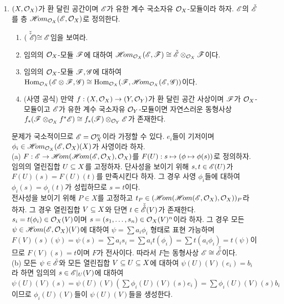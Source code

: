 	\begin{enumerate}[label=\tb{5.\arabic*.},itemindent=0mm,itemsep=4mm]
	\item $(X,\mathcal{O}_X)$가 환 달린 공간이며 $\mathscr{E}$가 유한 계수 국소자유 $\mathcal{O}_X$-모듈이라 하자.
	$\mathscr{E}$의  $\check{\mathscr{E}}$를 층 $\mathscr{H}\!om_{\mathcal{O}_X}(\mathscr{E},\mathcal{O}_X)$로 정의한다.
	\begin{enumerate}[label=(\alph*)]
	\item $\check{(\check{\mathscr{E}})}\cong\mathscr{E}$임을 보여라.
	\item 임의의 $\mathcal{O}_X$-모듈 $\mathscr{F}$에 대하여 $\mathscr{H}\!om_{\mathcal{O}_X}(\mathscr{E},\mathscr{F})\cong\check{\mathscr{E}}\otimes_{\mathcal{O}_X}\mathscr{F}$이다.
	\item 임의의 $\mathcal{O}_X$-모듈 $\mathscr{F},\mathscr{G}$에 대하여 $\operatorname{Hom}_{\mathcal{O}_X}(\mathscr{E}\otimes\mathscr{F},\mathscr{G})\cong
	\operatorname{Hom}_{\mathcal{O}_X}(\mathscr{F},\mathscr{H}\!om_{\mathcal{O}_X}(\mathscr{E},\mathscr{G}))$이다.
	\item (사영 공식) 만약 $f:(X,\mathcal{O}_X)\rightarrow(Y,\mathcal{O}_Y)$가 환 달린 공간 사상이며 $\mathscr{F}$가 $\mathcal{O}_X$-모듈이고
	$\mathscr{E}$가 유한 계수 국소자유 $\mathcal{O}_Y$-모듈이면
	자연스러운 동형사상 $f_*(\mathscr{F}\otimes_{\mathcal{O}_X}f^*\mathscr{E})\cong f_*(\mathscr{F})\otimes_{\mathcal{O}_Y}\mathscr{E}$가 존재한다.
	\end{enumerate}
	\sol 문제가 국소적이므로 $\mathscr{E}=\mathcal{O}_X^n$이라 가정할 수 있다.
	$e_i$들이 기저이며 $\phi_i\in\mathscr{H}\!om_{\mathcal{O}_X}(\mathscr{E},\mathcal{O}_X)(X)$가 사영이라 하자.\\
	(a) $F:\mathscr{E}\rightarrow\mathscr{H}\!om(\mathscr{H}\!om(\mathscr{E},\mathcal{O}_X),\mathcal{O}_X)$를 $F(U):s\mapsto(\phi\mapsto\phi(s))$로 정의하자.
	임의의 열린집합 $U\subseteq X$를 고정하자. 단사성을 보이기 위해 $s,t\in\mathscr{E}(U)$가 $F(U)(s)=F(U)(t)$를 만족시킨다 하자.
	그 경우 사영 $\phi_i$들에 대하여 $\phi_i(s)=\phi_i(t)$가 성립하므로 $s=t$이다.\\
	전사성을 보이기 위해 $P\in X$를 고정하고 $t_P\in(\mathscr{H}\!om(\mathscr{H}\!om(\mathscr{E},\mathcal{O}_X),\mathcal{O}_X))_P$라 하자.
	그 경우 열린집합 $V\subseteq X$와 단면 $t\in\check{\check{\mathscr{E}}}(V)$가 존재한다.
	$s_i=t(\phi_i)\in\mathcal{O}_X(V)$이며 $s=(s_1,\ldots,s_n)\in\mathcal{O}_X(V)^n$이라 하자.
	그 경우 모든 $\psi\in\mathscr{H}\!om(\mathscr{E},\mathcal{O}_X)(V)$에 대하여 $\psi=\sum a_i\phi_i$ 형태로 표현 가능하며
	$F(V)(s)(\psi)=\psi(s)=\sum a_is_i=\sum a_it(\phi_i)=\sum t(a_i\phi_i)=t(\psi)$이므로 $F(V)(s)=t$이며 $F$가 전사이다.
	따라서 $F$는 동형사상 $\mathscr{E}\cong\check{\check{\mathscr{E}}}$이다.\\
	(b) 모든 $\psi\in\check{\mathscr{E}}$와 모든 열린집합 $V\subseteq U\subseteq X$에 대하여 $\psi(U)(V)(e_i)=b_i$라 하면
	임의의 $s\in\mathscr{E}|_U(V)$에 대하여 $\psi(U)(V)(s)=\psi(U)(V)(\sum\phi_i(U)(V)(s)e_i)=\sum\phi_i(U)(V)(s)b_i$이므로
	$\phi_i(U)(V)$들이 $\psi(U)(V)$들을 생성한다.

\end{enumerate}
